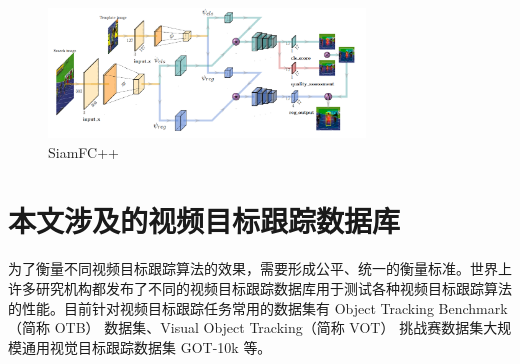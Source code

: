 \begin{figure}
\centering
\includegraphics[width=0.75\textwidth]{Img/related/SiamFC++.png}
\caption{SiamFC++}
\end{figure}

\section{本文涉及的视频目标跟踪数据库}
为了衡量不同视频目标跟踪算法的效果，需要形成公平、统一的衡量标准。世界上许多研究机构都发布了不同的视频目标跟踪数据库用于测试各种视频目标跟踪算法的性能。目前针对视频目标跟踪任务常用的数据集有  Object Tracking Benchmark（简称 OTB）\cite{OTB} 数据集、Visual Object Tracking（简称 VOT）\cite{VOT} 挑战赛数据集大规模通用视觉目标跟踪数据集 GOT-10k \cite{GOT-10k} 等。
